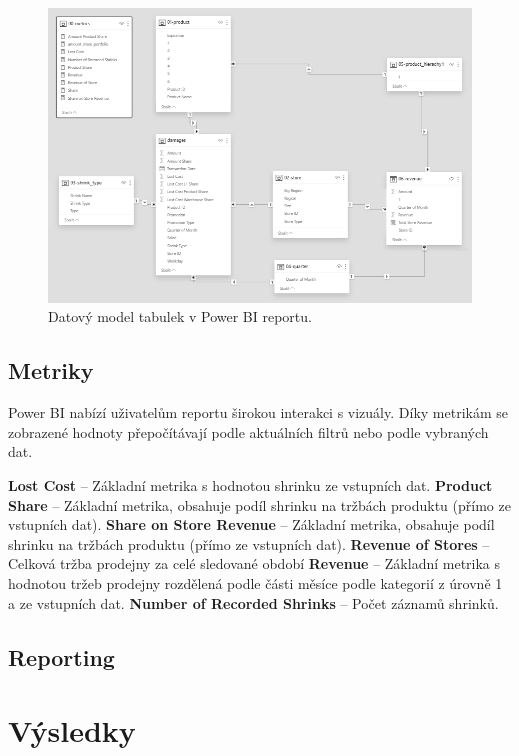\begin{figure}[hbtp!]
    \centering
    \captionsetup{justification=centering}
    \includegraphics[width=\textwidth]{obrazky/PBI/datmodel.png}
    \caption{Datový model tabulek v Power BI reportu.}
    \label{obr:datmod}
\end{figure}

\subsection{Metriky}

Power BI nabízí uživatelům reportu širokou interakci s vizuály. Díky metrikám se zobrazené hodnoty přepočítávají podle aktuálních filtrů nebo podle vybraných dat. 

\textbf{Lost Cost} -- Základní metrika s hodnotou shrinku ze vstupních dat.
\textbf{Product Share} -- Základní metrika, obsahuje podíl shrinku na tržbách produktu (přímo ze vstupních dat).
\textbf{Share on Store Revenue} -- Základní metrika, obsahuje podíl shrinku na tržbách produktu (přímo ze vstupních dat).
\textbf{Revenue of Stores} -- Celková tržba prodejny za celé sledované období
\textbf{Revenue} -- Základní metrika s hodnotou tržeb prodejny rozdělená podle části měsíce podle kategorií z úrovně 1 a  ze vstupních dat.
\textbf{Number of Recorded Shrinks} -- Počet záznamů shrinků.


\subsection{Reporting}


\section{Výsledky}
\label{sec:vizualizace:vysl}
